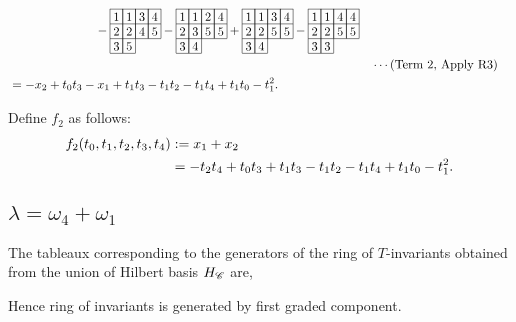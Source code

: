 \begin{align*}
\begin{array}[c]{*{4}c}
\end{array}
\\
&\hspace{70pt}
-\begin{array}[c]{*{4}c}\cline{1-4}
\lr{1}&\lr{1}&\lr{3}&\lr{4}\\\cline{1-4}
\lr{2}&\lr{2}&\lr{4}&\lr{5}\\\cline{1-4}
\lr{3}&\lr{5}\\\cline{1-2}
\end{array}
-\begin{array}[c]{*{4}c}\cline{1-4}
\lr{1}&\lr{1}&\lr{2}&\lr{4}\\\cline{1-4}
\lr{2}&\lr{3}&\lr{5}&\lr{5}\\\cline{1-4}
\lr{3}&\lr{4}\\\cline{1-2}
\end{array}
+\begin{array}[c]{*{4}c}\cline{1-4}
\lr{1}&\lr{1}&\lr{3}&\lr{4}\\\cline{1-4}
\lr{2}&\lr{2}&\lr{5}&\lr{5}\\\cline{1-4}
\lr{3}&\lr{4}\\\cline{1-2}
\end{array}
-\begin{array}[c]{*{4}c}\cline{1-4}
\lr{1}&\lr{1}&\lr{4}&\lr{4}\\\cline{1-4}
\lr{2}&\lr{2}&\lr{5}&\lr{5}\\\cline{1-4}
\lr{3}&\lr{3}\\\cline{1-2}
\end{array}
\\
& &&\cdots (\text{Term 2, Apply R3})\\
&=
-x_2 + t_0t_3 - x_1 + t_1t_3 - t_1t_2 - t_1t_4 + t_1t_0 - t_1^2.
\end{align*}

Define \(f_2\) as follows:
\begin{align*}
    f_2(t_0,t_1,t_2,t_3,t_4) &:= x_1 + x_2\\ 
    & = - t_2t_4 + t_0t_3 + t_1t_3 - t_1t_2 - t_1t_4 + t_1t_0 - t_1^2.
\end{align*}


\subsection{\(\lambda=\omega_4+\omega_1\)}
\label{sec:fv_hb41}
The tableaux corresponding to the generators of the ring of $T$-invariants obtained from the union of Hilbert basis $H_{\mathscr{C}}$ are,

Hence ring of invariants is generated by first graded component.

